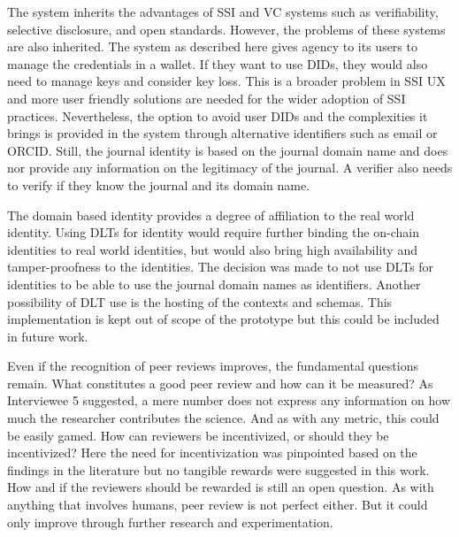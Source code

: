 The system inherits the advantages of \acrshort{SSI} and \acrshort{VC} systems such as verifiability, selective disclosure, and open standards. However, the problems of these systems are also inherited. The system as described here gives agency to its users to manage the credentials in a wallet. If they want to use \acrshort{DID}s, they would also need to manage keys and consider key loss. This is a broader problem in \acrshort{SSI} \acrshort{UX} and more user friendly solutions are needed for the wider adoption of \acrshort{SSI} practices. Nevertheless, the option to avoid user \acrshort{DID}s and the complexities it brings is provided in the system through alternative identifiers such as email or \acrshort{ORCID}. Still, the journal identity is based on the journal domain name and does nor provide any information on the legitimacy of the journal. A verifier also needs to verify if they know the journal and its domain name. 

The domain based identity provides a degree of affiliation to the real world identity. Using \acrshort{DLT}s for identity would require further binding the on-chain identities to real world identities, but would also bring high availability and tamper-proofness to the identities. The decision was made to not use \acrshort{DLT}s for identities to be able to use the journal domain names as identifiers. Another possibility of \acrshort{DLT} use is the hosting of the contexts and schemas. This implementation is kept out of scope of the prototype but this could be included in future work.

Even if the recognition of peer reviews improves, the fundamental questions remain. What constitutes a good peer review and how can it be measured? As Interviewee 5 suggested, a mere number does not express any information on how much the researcher contributes the science. And as with any metric, this could be easily gamed. How can reviewers be incentivized, or should they be incentivized? Here the need for incentivization was pinpointed based on the findings in the literature but no tangible rewards were suggested in this work. How and if the reviewers should be rewarded is still an open question. As with anything that involves humans, peer review is not perfect either. But it could only improve through further research and experimentation.